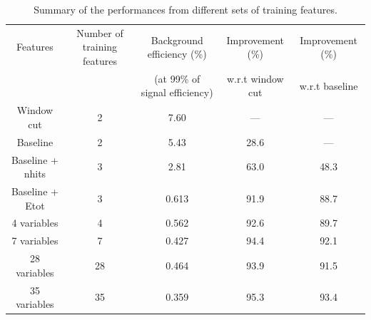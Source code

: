 \begin{table}[!ht]
  \begin{center}
    {\scriptsize
    \begin{tabular}{ccccc}
    	Features &  Number of training features & Background efficiency (\%) & Improvement (\%) & Improvement (\%) \\
    		& 	& (at 99\% of signal efficiency) & w.r.t window cut & w.r.t baseline \\
    	\hline
    	Window cut & 2 & 7.60 & --- & --- \\
    	Baseline & 2 & 5.43 & 28.6 & --- \\
    	Baseline + nhits & 3 & 2.81 & 63.0 & 48.3 \\
    	Baseline + Etot & 3 & 0.613 & 91.9 & 88.7 \\
    	4 variables & 4 & 0.562 & 92.6 & 89.7 \\
    	7 variables &  7 & 0.427 & 94.4 & 92.1 \\
    	28 variables &  28 & 0.464 & 93.9 & 91.5 \\
    	35 variables & 35 & 0.359 & 95.3 & 93.4\\
    \end{tabular}
    }
  \end{center}
  \caption{Summary of the performances from different sets of training features. \label{tab:performance-summary}}
\end{table}